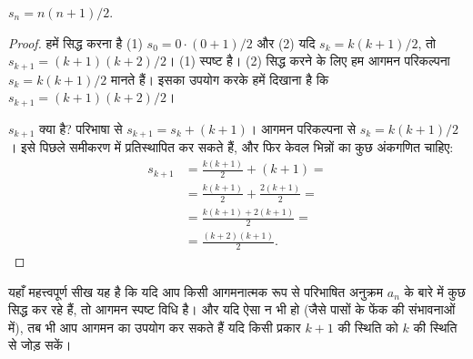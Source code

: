 \documentclass[../../../include/open-logic-section]{subfiles}
\begin{document}
\begin{prop}
  $s_n = n(n+1)/2$.
\end{prop}

\begin{proof}
  हमें सिद्ध करना है (1) $s_0=0\cdot(0+1)/2$ और (2) यदि
  $s_k=k(k+1)/2$, तो $s_{k+1}=(k+1)(k+2)/2$। (1) स्पष्ट है। (2) सिद्ध
  करने के लिए हम आगमन परिकल्पना $s_k=k(k+1)/2$ मानते हैं। इसका उपयोग करके
  हमें दिखाना है कि $s_{k+1}=(k+1)(k+2)/2$।

  $s_{k+1}$ क्या है? परिभाषा से $s_{k+1}=s_k+(k+1)$। आगमन परिकल्पना से
  $s_k=k(k+1)/2$। इसे पिछले समीकरण में प्रतिस्थापित कर सकते हैं, और फिर
  केवल भिन्नों का कुछ अंकगणित चाहिए:
  \begin{align*}
    s_{k+1} & = \frac{k(k+1)}{2} + (k+1) = {}\\
    & = \frac{k(k+1)}{2} + \frac{2(k+1)}{2} = {}\\
    & = \frac{k(k+1) + 2(k+1)}{2} = {}\\
    & = \frac{(k+2)(k+1)}{2}.
  \end{align*}
\end{proof}

यहाँ महत्त्वपूर्ण सीख यह है कि यदि आप किसी आगमनात्मक रूप से परिभाषित अनुक्रम
$a_n$ के बारे में कुछ सिद्ध कर रहे हैं, तो आगमन स्पष्ट विधि है। और यदि ऐसा
न भी हो (जैसे पासों के फेंक की संभावनाओं में), तब भी आप आगमन का उपयोग कर
सकते हैं यदि किसी प्रकार $k+1$ की स्थिति को $k$ की स्थिति से जोड़ सकें।
\end{document}
